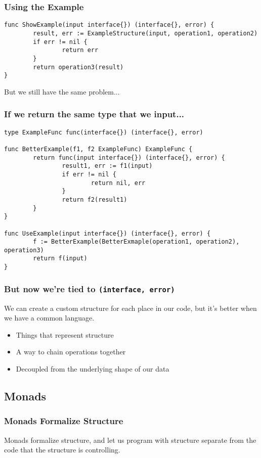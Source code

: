 \documentclass{beamer}
\begin{document}
\begin{frame}[fragile]
  \frametitle{Using the Example}
\begin{lstlisting}
func ShowExample(input interface{}) (interface{}, error) {
        result, err := ExampleStructure(input, operation1, operation2)
        if err != nil {
                return err
        }
        return operation3(result)
}
\end{lstlisting}
  \vfill
  But we still have the same problem...
\end{frame}

\begin{frame}[fragile]
  \frametitle{If we return the same type that we input...}
\begin{lstlisting}
type ExampleFunc func(interface{}) (interface{}, error)

func BetterExample(f1, f2 ExampleFunc) ExampleFunc {
        return func(input interface{}) (interface{}, error) {
                result1, err := f1(input)
                if err != nil {
                        return nil, err
                }
                return f2(result1)
        }
}

func UseExample(input interface{}) (interface{}, error) {
        f := BetterExample(BetterExmaple(operation1, operation2), operation3)
        return f(input)
}
\end{lstlisting}
\end{frame}

\begin{frame}[fragile]
  \frametitle{But now we're tied to {\tt (interface{}, error)}}

  We can create a custom structure for each place in our code, but
  it's better when we have a common language.

  \begin{itemize}
  \item Things that represent structure
  \item A way to chain operations together
  \item Decoupled from the underlying shape of our data
  \end{itemize}
\end{frame}
\subsection{Monads}

\begin{frame}
  \frametitle{Monads Formalize Structure}

  Monads formalize structure, and let us program with structure
  separate from the code that the structure is controlling.
\end{frame}
\end{document}
